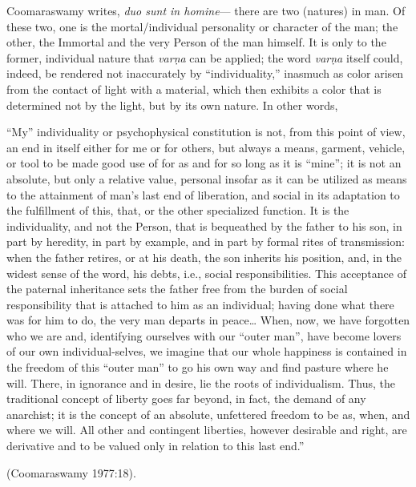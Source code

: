Coomaraswamy writes,  {\sl duo sunt in homine}--- there are two (natures) in man. Of these two, one is the mortal/individual personality or character of the man; the other, the Immortal and the very Person of the man himself. It is only to the former, individual nature that {\sl varṇa} can be applied; the word {\sl varṇa} itself could, indeed, be rendered not inaccurately by “individuality,” inasmuch as color arisen from the contact of light with a material, which then exhibits a color that is determined not by the light, but by its own nature. In other words, 

\begin{myquote}
“My” individuality or psychophysical constitution is not, from this point of view, an end in itself either for me or for others, but always a means, garment, vehicle, or tool to be made good use of for as and for so long as it is “mine”; it is not an absolute, but only a relative value, personal insofar as it can be utilized as means to the attainment of man’s last end of liberation, and social in its adaptation to the fulfillment of this, that, or the other specialized function. It is the individuality, and not the Person, that is bequeathed by the father to his son, in part by heredity, in part by example, and in part by formal rites of transmission: when the father retires, or at his death, the son inherits his position, and, in the widest sense of the word, his debts, i.e., social responsibilities. This acceptance of the paternal inheritance sets the father free from the burden of social responsibility that is attached to him as an individual; having done what there was for him to do, the very man departs in peace… When, now, we have forgotten who we are and, identifying ourselves with our “outer man”, have become lovers of our own individual-selves, we imagine that our whole happiness is contained in the freedom of this “outer man” to go his own way and find pasture where he will. There, in ignorance and in desire, lie the roots of individualism. Thus, the traditional concept of liberty goes far beyond, in fact, the demand of any anarchist; it is the concept of an absolute, unfettered freedom to be as, when, and where we will. All other and contingent liberties, however desirable and right, are derivative and to be valued only in relation to this last end.”

\hfill (Coomaraswamy 1977:18).
\end{myquote}

